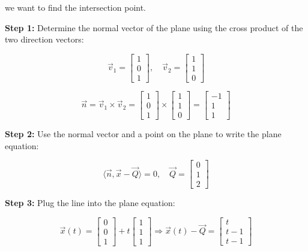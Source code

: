 we want to find the intersection point.

\textbf{Step 1:} Determine the normal vector of the plane using the cross product of the two direction vectors:

\[
	\vec{v}_1 = \begin{bmatrix} 1 \\ 0 \\ 1 \end{bmatrix}, \quad \vec{v}_2 = \begin{bmatrix} 1 \\ 1 \\ 0 \end{bmatrix}
\]

\[
	\vec{n} = \vec{v}_1 \times \vec{v}_2 =
	\begin{bmatrix} 1 \\ 0 \\ 1 \end{bmatrix} \times \begin{bmatrix} 1 \\ 1 \\ 0 \end{bmatrix} =
	\begin{bmatrix} -1 \\ 1 \\ 1 \end{bmatrix}
\]

\textbf{Step 2:} Use the normal vector and a point on the plane to write the plane equation:

\[
	\langle \vec{n}, \vec{x} - \vec{Q} \rangle = 0, \quad \vec{Q} = \begin{bmatrix} 0 \\ 1 \\ 2 \end{bmatrix}
\]

\textbf{Step 3:} Plug the line into the plane equation:

\[
	\vec{x}(t) = \begin{bmatrix} 0 \\ 0 \\ 1 \end{bmatrix} + t \begin{bmatrix} 1 \\ 1 \\ 1 \end{bmatrix}
	\Rightarrow
	\vec{x}(t) - \vec{Q} =
	\begin{bmatrix} t \\ t - 1 \\ t - 1 \end{bmatrix}
\]

